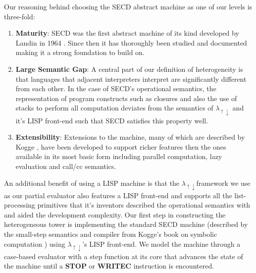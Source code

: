 \documentclass[a4paper,12pt,twoside,openright]{report}
\theoremstyle{definition}
\newcommand{\mslang}{$\lambda_{\uparrow\downarrow}$}
\begin{document}
Our reasoning behind choosing the SECD abstract machine as one of our levels is three-fold:
\begin{enumerate}
	\item \textbf{Maturity}: SECD was the first abstract machine of its kind developed by Landin in 1964 \cite{landin1964mechanical}. Since then it has thoroughly been studied and documented \cite{danvy2004rational,ramsdell1999tail,henderson1980functional} making it a strong foundation to build on.
	\item \textbf{Large Semantic Gap}: A central part of our definition of heterogeneity is that languages that adjacent interpreters interpret are significantly different from each other. In the case of SECD's operational semantics, the representation of program constructs such as closures and also the use of stacks to perform all computation deviates from the semantics of \mslang{} and it's LISP front-end such that SECD satisfies this property well.
	\item \textbf{Extensibility}: Extensions to the machine, many of which are described by Kogge \cite{kogge1990architecture}, have been developed to support richer features then the ones available in its most basic form including parallel computation, lazy evaluation and call/cc semantics.
\end{enumerate}
An additional benefit of using a LISP machine is that the \mslang framework we use as our partial evaluator also features a LISP front-end and supports all the list-processing primitives that it's inventors described the operational semantics with and aided the development complexity. Our first step in constructing the heterogeneous tower is implementing the standard SECD machine (described by the small-step semantics and compiler from Kogge's book on symbolic computation \cite{kogge1990architecture}) using \mslang's LISP front-end. We model the machine through a case-based evaluator with a step function at its core that advances the state of the machine until a \textbf{STOP} or \textbf{WRITEC} instruction is encountered.
\end{document}
